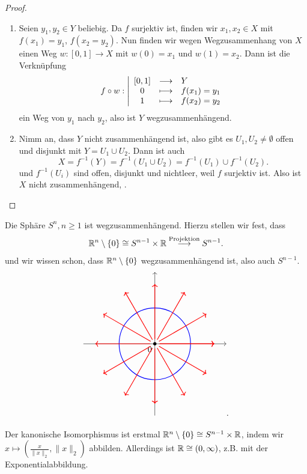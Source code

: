 \begin{proof}
    \begin{enumerate}[1)]
        \item Seien $y_1,y_2\in Y$ beliebig. Da $f$ surjektiv ist, finden wir  $x_1,x_2\in X$ mit $f(x_1) = y_1$, $f(x_2=y_2)$. Nun finden wir wegen Wegzusammenhang von $X$ einen Weg  $w: [0,1] \to X$ mit $w(0) = x_1$ und $w(1) = x_2$. Dann ist die Verknüpfung
                \begin{equation*}
                f \circ  w: \left| \begin{array}{c c l} 
                    [0,1] & \longrightarrow & Y \\
                    0 & \longmapsto &  f(x_1) = y_1 \\
                    1 & \longmapsto & f(x_2) = y_2
                \end{array} \right.
            \end{equation*}
            ein Weg von $y_1$ nach $y_2$, also ist $Y$ wegzusammenhängend.
        \item Nimm an, dass $Y$ nicht zusammenhängend ist, also gibt es  $U_1,U_2\neq \emptyset$ offen und disjunkt mit $Y = U_1 \cup U_2$. Dann ist auch
            \[
                X = f^{-1}(Y) = f^{-1}(U_1\cup U_2) = f^{-1}(U_1) \cup f^{-1}(U_2)
            .\] 
            und $f^{-1}(U_i)$ sind offen, disjunkt und nichtleer, weil $f$ surjektiv ist. Also ist $X$ nicht zusammenhängend, \contra.
    \end{enumerate}
\end{proof}

\begin{example}
    Die Sphäre $S^n, n\geq 1$ ist wegzusammenhängend. Hierzu stellen wir fest, dass
    \[
        \mathbb{R}^n \setminus \left \{0\right\}  \cong S^{n-1}\times \mathbb{R} \stackrel{\text{Projektion}}{\longrightarrow} S^{n-1}
    .\] 
und wir wissen schon, dass $\mathbb{R}^n \setminus \left \{0\right\}$ wegzusammenhängend ist, also auch $S^{n-1}$.
\[
\begin{tikzpicture}
    \draw[->] (-3,0) -- (3,0);
    \draw[->] (0,-3) -- (0,3) node[midway, anchor = north east] {$0$};
    \fill (0,0) circle (2pt);
    \draw[blue, thick] (0,0) circle (1.5);
    \foreach \x in {0,...,12} {
        \draw[red,thick,->] (\x*30:0.2) -- (\x*30:2.5);
    }
\end{tikzpicture}
.\] 
\end{example}

\begin{remark*}
    Der kanonische Isomorphismus ist erstmal $\mathbb{R}^n \setminus \left \{0\right\}  \cong S^{n-1}\times \mathbb{R}$, indem wir $x \mapsto \left( \frac{x}{\lVert x \rVert_2 },\lVert x \rVert _2 \right) $ abbilden. Allerdings ist $\mathbb{R} \cong (0,\infty)$, z.B. mit der Exponentialabbildung.
\end{remark*}



